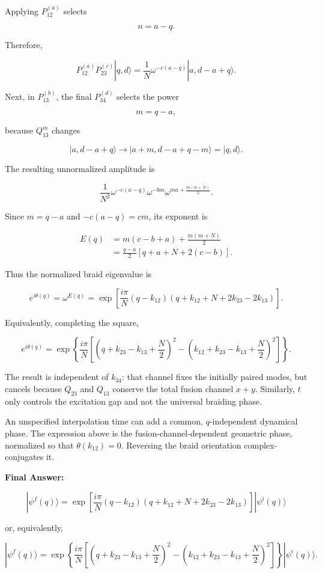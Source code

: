 \documentclass[11pt]{article}
\begin{document}
Applying $P_{12}^{(a)}$ selects

\[
n=a-q.
\]

Therefore,

\[
P_{12}^{(a)}P_{23}^{(c)}|q,d\rangle
=
\frac1N
\omega^{-c(a-q)}
|a,d-a+q\rangle.
\]

Next, in $P_{13}^{(b)}$, the final $P_{34}^{(d)}$ selects the power

\[
m=q-a,
\]

because $Q_{13}^m$ changes

\[
|a,d-a+q\rangle
\longrightarrow
|a+m,d-a+q-m\rangle
=
|q,d\rangle.
\]

The resulting unnormalized amplitude is

\[
\frac{1}{N^2}
\omega^{-c(a-q)}
\omega^{-bm}
\omega^{ma+\frac{m(m+N)}2}.
\]

Since $m=q-a$ and $-c(a-q)=cm$, its exponent is

\[
\begin{aligned}
E(q)
&=
m(c-b+a)+\frac{m(m+N)}2\\
&=
\frac{q-a}{2}
\left[q+a+N+2(c-b)\right].
\end{aligned}
\]

Thus the normalized braid eigenvalue is

\[
e^{i\theta(q)}
=
\omega^{E(q)}
=
\exp\!\left[
\frac{i\pi}{N}
(q-k_{12})
\left(
q+k_{12}+N+2k_{23}-2k_{13}
\right)
\right].
\]

Equivalently, completing the square,

\[
e^{i\theta(q)}
=
\exp\!\left\{
\frac{i\pi}{N}
\left[
\left(q+k_{23}-k_{13}+\frac N2\right)^2
-
\left(k_{12}+k_{23}-k_{13}+\frac N2\right)^2
\right]
\right\}.
\]

The result is independent of $k_{34}$: that channel fixes the initially paired modes, but cancels because $Q_{23}$ and $Q_{13}$ conserve the total fusion channel $x+y$. Similarly, $t$ only controls the excitation gap and not the universal braiding phase.

An unspecified interpolation time can add a common, $q$-independent dynamical phase. The expression above is the fusion-channel-dependent geometric phase, normalized so that $\theta(k_{12})=0$. Reversing the braid orientation complex-conjugates it.

\textbf{Final Answer:}

\[
\boxed{
|\psi^f(q)\rangle
=
\exp\!\left[
\frac{i\pi}{N}
(q-k_{12})
\left(
q+k_{12}+N+2k_{23}-2k_{13}
\right)
\right]
|\psi^i(q)\rangle
}
\]

or, equivalently,

\[
\boxed{
|\psi^f(q)\rangle
=
\exp\!\left\{
\frac{i\pi}{N}
\left[
\left(q+k_{23}-k_{13}+\frac N2\right)^2
-
\left(k_{12}+k_{23}-k_{13}+\frac N2\right)^2
\right]
\right\}
|\psi^i(q)\rangle .
}
\]
\end{document}
